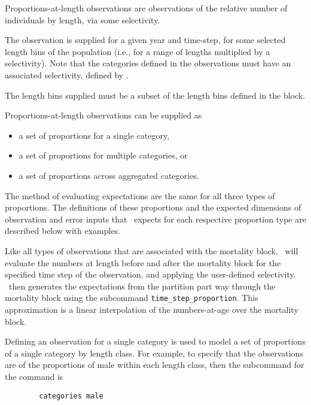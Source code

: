 Proportions-at-length observations are observations of the relative number of individuals by length, via some selectivity.

The observation is supplied for a given year and time-step, for some selected length bins of the population (i.e., for a range of lengths multiplied by a selectivity). Note that the categories defined in the observations must have an associated selectivity, defined by .

The length bins supplied must be a subset of the length bins defined in the  block. 

Proportions-at-length observations can be supplied as

\begin{itemize}
	\item a set of proportions for a single category,
	\item a set of proportions for multiple categories, or
	\item a set of proportions across aggregated categories.
\end{itemize}

The method of evaluating expectations are the same for all three types of proportions. The definitions of these proportions and the expected dimensions of observation and error inputs that \CNAME\ expects for each respective proportion type are described below with examples.

Like all types of observations that are associated with the mortality block, \CNAME\ will evaluate the numbers at length before and after the mortality block for the specified time step of the observation, and applying the user-defined selectivity. \CNAME\ then generates the expectations from the partition part way through the mortality block using the subcommand \texttt{time\_step\_proportion}. This approximation is a linear interpolation of the numbers-at-age over the mortality block.

Defining an observation for a single category is used to model a set of proportions of a single category by length class. For example, to specify that the observations are of the proportions of male within each length class, then the subcommand  for the  command is

{\small{\begin{verbatim}
		categories male
		\end{verbatim}}}

